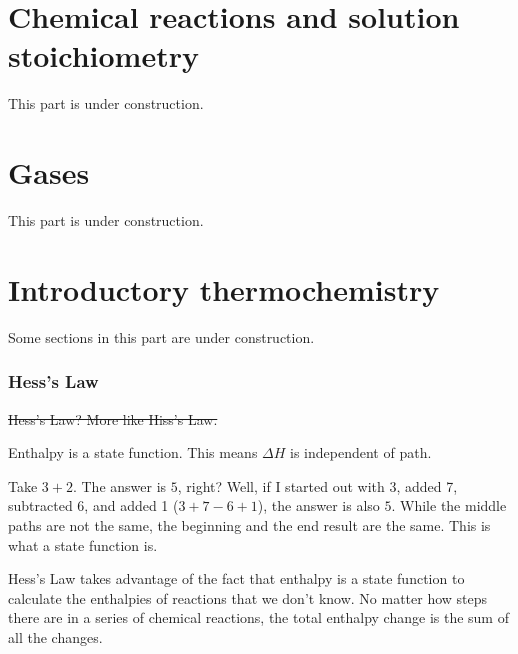 \documentclass[letterpaper, 12pt]{article}
\begin{document}
\clearpage

\part{Chemical reactions and solution stoichiometry}
This part is under construction.







\clearpage

\part{Gases}
This part is under construction.


\clearpage

\part{Introductory thermochemistry}

Some sections in this part are under construction.

\section{Hess's Law}
\st{Hess's Law? More like Hiss's Law.}

Enthalpy is a state function. This means $\Delta H$ is independent of path.

Take $3 + 2$. The answer is $5$, right? Well, if I started out with 3, added 7, subtracted 6, and added 1 ($3 + 7 - 6 + 1$), the answer is also $5$. While the middle paths are not the same, the beginning and the end result are the same. This is what a state function is.

Hess's Law takes advantage of the fact that enthalpy is a state function to calculate the enthalpies of reactions that we don't know. No matter how steps there are in a series of chemical reactions, the total enthalpy change is the sum of all the changes.
\end{document}
